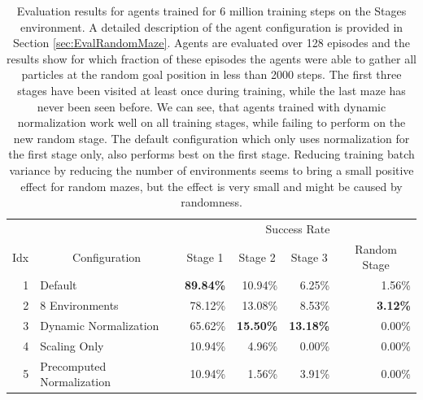 \begin{table}[htp]
    \begin{center}
        \begin{tabular}{rlrrrr}
            \toprule
            & & \multicolumn{4}{c}{Success Rate} \\
            \cmidrule(lr){3-6}
            \multicolumn{1}{c}{Idx} & \multicolumn{1}{c}{Configuration} & \multicolumn{1}{c}{Stage 1} & \multicolumn{1}{c}{Stage 2} & \multicolumn{1}{c}{Stage 3} & \multicolumn{1}{c}{Random Stage} \\
            \midrule
            1 & Default & \textbf{89.84\%} & 10.94\% & 6.25\% & 1.56\% \\
            2 & 8 Environments & 78.12\% & 13.08\% & 8.53\% & \textbf{3.12\%} \\
            3 & Dynamic Normalization & 65.62\% & \textbf{15.50\%} & \textbf{13.18\%} & 0.00\% \\
            4 & Scaling Only & 10.94\% & 4.96\% & 0.00\% & 0.00\% \\
            5 & Precomputed Normalization & 10.94\% & 1.56\% & 3.91\% & 0.00\%\\
            \bottomrule
        \end{tabular}
        \caption[Evaluation Results for Agents Trained on the Stages Environment]{Evaluation results for agents trained for 6 million training steps on the Stages environment. A detailed description of the agent configuration is provided in Section \ref{sec:EvalRandomMaze}. Agents are evaluated over 128 episodes and the results show for which fraction of these episodes the agents were able to gather all particles at the random goal position in less than 2000 steps. The first three stages have been visited at least once during training, while the last maze has never been seen before. We can see, that agents trained with dynamic normalization work well on all training stages, while failing to perform on the new random stage. The default configuration which only uses normalization for the first stage only, also performs best on the first stage. Reducing training batch variance by reducing the number of environments seems to bring a small positive effect for random mazes, but the effect is very small and might be caused by randomness.} \label{tab:Eval/RandomMaze}
    \end{center}
\end{table}

